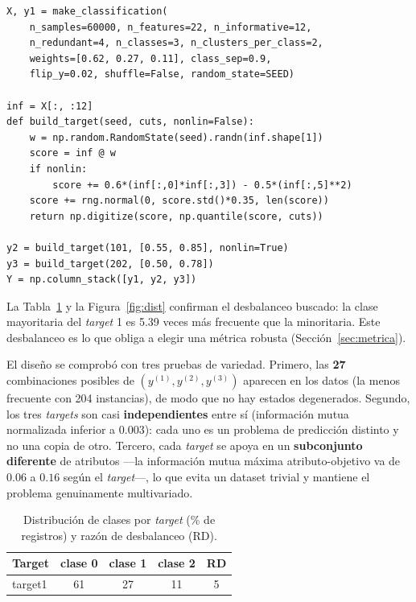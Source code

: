 \documentclass[11pt,a4paper,twocolumn]{article}
\providecommand{\IRtargetone}{5.39}\providecommand{\IRtargettwo}{3.67}\providecommand{\IRtargetthree}{2.27}\providecommand{\IRmax}{5.39}
\providecommand{\TablaDist}{target1 & 61 & 27 & 11 & 5 \\}
\begin{document}
\begin{lstlisting}[caption={C1 -- Generación multi-target multiclase desbalanceada}]
X, y1 = make_classification(
    n_samples=60000, n_features=22, n_informative=12,
    n_redundant=4, n_classes=3, n_clusters_per_class=2,
    weights=[0.62, 0.27, 0.11], class_sep=0.9,
    flip_y=0.02, shuffle=False, random_state=SEED)

inf = X[:, :12]
def build_target(seed, cuts, nonlin=False):
    w = np.random.RandomState(seed).randn(inf.shape[1])
    score = inf @ w
    if nonlin:
        score += 0.6*(inf[:,0]*inf[:,3]) - 0.5*(inf[:,5]**2)
    score += rng.normal(0, score.std()*0.35, len(score))
    return np.digitize(score, np.quantile(score, cuts))

y2 = build_target(101, [0.55, 0.85], nonlin=True)
y3 = build_target(202, [0.50, 0.78])
Y = np.column_stack([y1, y2, y3])
\end{lstlisting}

La Tabla~\ref{tab:dist} y la Figura~\ref{fig:dist} confirman el desbalanceo buscado: la clase mayoritaria
del \textit{target} 1 es \IRtargetone{} veces más frecuente que la minoritaria. Este desbalanceo es lo que
obliga a elegir una métrica robusta (Sección~\ref{sec:metrica}).

El diseño se comprobó con tres pruebas de variedad. Primero, las \textbf{27} combinaciones posibles de
$(y^{(1)},y^{(2)},y^{(3)})$ aparecen en los datos (la menos frecuente con 204 instancias), de modo que no
hay estados degenerados. Segundo, los tres \textit{targets} son casi \textbf{independientes} entre sí
(información mutua normalizada inferior a $0.003$): cada uno es un problema de predicción distinto y no una
copia de otro. Tercero, cada \textit{target} se apoya en un \textbf{subconjunto diferente} de atributos ---la
información mutua máxima atributo-objetivo va de $0.06$ a $0.16$ según el \textit{target}---, lo que evita un
dataset trivial y mantiene el problema genuinamente multivariado.

\begin{table}[H]
\centering
\caption{Distribución de clases por \textit{target} (\% de registros) y razón de desbalanceo (RD).}
\label{tab:dist}
\small
\begin{tabular}{lcccc}
\toprule
\textbf{Target} & \textbf{clase 0} & \textbf{clase 1} & \textbf{clase 2} & \textbf{RD} \\
\midrule
\TablaDist
\bottomrule
\end{tabular}
\end{table}
\end{document}
